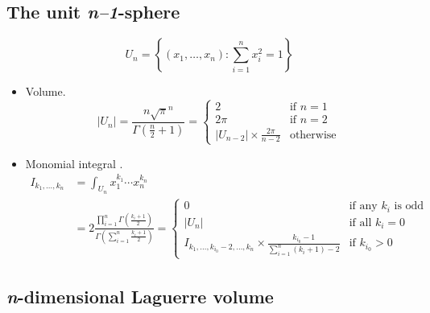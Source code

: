 \documentclass[draft]{scrartcl}
\begin{document}
\subsection*{The unit \textit{n--1}-sphere}
\[
  U_n = \left\{(x_1,\dots,x_n): \sum_{i=1}^n x_i^2 = 1\right\}
\]

\begin{itemize}
  \item Volume.
\begin{equation*}\label{ndimsphere}
  |U_n|
  = \frac{n \sqrt{\pi}^n}{\Gamma(\frac{n}{2}+1)}
  = \begin{cases}
    2&\text{if $n = 1$}\\
    2\pi&\text{if $n = 2$}\\
    |U_{n-2}| \times \frac{2\pi}{n - 2}&\text{otherwise}
  \end{cases}
\end{equation*}

  \item Monomial integral \cite{folland}.
\[
  \begin{split}
  I_{k_1,\dots,k_n}
  &= \int_{U_n} x_1^{k_1}\cdots x_n^{k_n}\\
  &= 2 \frac{\prod_{i=1}^n
    \Gamma\left(\frac{k_i+1}{2}\right)}{\Gamma\left(\sum_{i=1}^n\frac{k_i+1}{2}\right)}
  =\begin{cases}
    0&\text{if any $k_i$ is odd}\\
    |U_n|&\text{if all $k_i=0$}\\
    I_{k_1,\dots,k_{i_0}-2,\dots,k_n} \times \frac{k_{i_0} - 1}{\sum_{i=1}^n (k_i+1) - 2}&\text{if $k_{i_0} > 0$}
  \end{cases}
  \end{split}
\]
\end{itemize}


\subsection*{\textit{n}-dimensional Laguerre volume}
\end{document}
